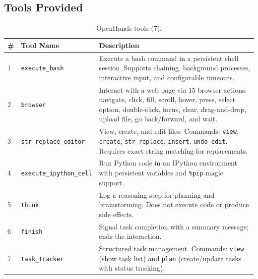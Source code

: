 \subsection{Tools Provided}
\label{sec:provided-tools}
\begin{table}[!h]
\begin{subtable}{\textwidth}
\centering
\caption{OpenHands tools (7).}
\label{tab:tools-openhands}
\small
\begin{tabular}{@{}llp{8.5cm}@{}}
\toprule
\textbf{\#} & \textbf{Tool Name} & \textbf{Description} \\
\midrule
1  & \texttt{execute\_bash}          & Execute a bash command in a persistent shell session. Supports chaining, background processes, interactive input, and configurable timeouts. \\
2  & \texttt{browser}                & Interact with a web page via 15 browser actions: navigate, click, fill, scroll, hover, press, select option, double-click, focus, clear, drag-and-drop, upload file, go back/forward, and wait. \\
3  & \texttt{str\_replace\_editor}   & View, create, and edit files. Commands: \texttt{view}, \texttt{create}, \texttt{str\_replace}, \texttt{insert}, \texttt{undo\_edit}. Requires exact string matching for replacements. \\
4  & \texttt{execute\_ipython\_cell} & Run Python code in an IPython environment with persistent variables and \texttt{\%pip} magic support. \\
5  & \texttt{think}                  & Log a reasoning step for planning and brainstorming. Does not execute code or produce side effects. \\
6  & \texttt{finish}                 & Signal task completion with a summary message; ends the interaction. \\
7  & \texttt{task\_tracker}          & Structured task management. Commands: \texttt{view} (show task list) and \texttt{plan} (create/update tasks with status tracking). \\
\bottomrule
\end{tabular}
\end{subtable}

\vspace{1em}


\end{table}
